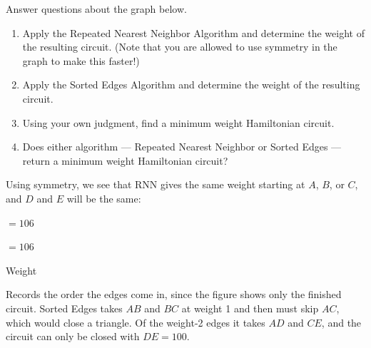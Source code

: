 \clearpage
{}

\begin{stmt}
Answer questions about the graph below.

\begin{center}\PentA{}\end{center}

\begin{enumerate}[nosep]
\item Apply the Repeated Nearest Neighbor Algorithm and determine the weight of the resulting
circuit. (Note that you are allowed to use symmetry in the graph to make this faster!)
\item Apply the Sorted Edges Algorithm and determine the weight of the resulting circuit.
\item Using your own judgment, find a minimum weight Hamiltonian circuit.
\item Does either algorithm --- Repeated Nearest Neighbor or Sorted Edges --- return a minimum
weight Hamiltonian circuit?
\end{enumerate}
\end{stmt}

\begin{sol}
Using symmetry, we see that RNN gives the same weight starting at $A$, $B$, or $C$, and $D$ and $E$
will be the same:

\begin{center}
 \quad $= 106$
\end{center}

\begin{center}
 \quad $= 106$
\end{center}
\end{sol}

\begin{sol}
\begin{center}\end{center}

\vspace{0.3em}
Weight 

\begin{add}{Records the order the edges come in, since the figure shows only the finished circuit.}
Sorted Edges takes $AB$ and $BC$ at weight 1 and then must skip $AC$, which would close a triangle.
Of the weight-2 edges it takes $AD$ and $CE$, and the circuit can only be closed with
$DE = 100$.
\end{add}
\end{sol}

